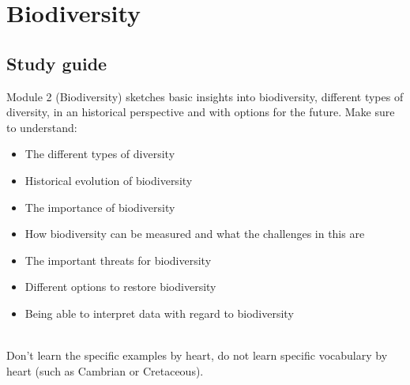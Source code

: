 \documentclass[../summary.tex]{subfiles}
\begin{document}
	
	\section{Biodiversity}
	
	\subsection{Study guide}
	
	Module 2 (Biodiversity) sketches basic insights into biodiversity, different types of diversity, in an historical perspective and with options for the future. Make sure to understand:
	\begin{itemize}
		\setlength{\itemsep}{0pt}
		\item The different types of diversity
		\item Historical evolution of biodiversity
		\item The importance of biodiversity
		\item How biodiversity can be measured and what the challenges in this are
		\item The important threats for biodiversity
		\item Different options to restore biodiversity
		\item Being able to interpret data with regard to biodiversity
	\end{itemize}
	\ \\
	Don't learn the specific examples by heart, do not learn specific vocabulary by heart (such as Cambrian or Cretaceous).
	\\
	
\end{document}

